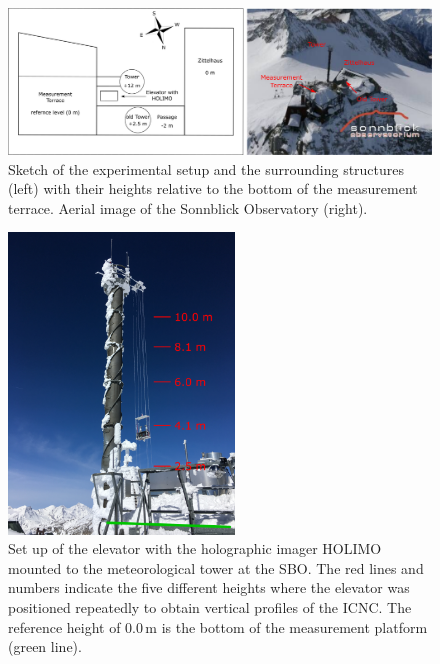 \documentclass[draft,linenumbers]{agujournal}
\begin{document}


\newpage

\begin{figure}[t]
 \centering
 	\includegraphics[width=14cm]{SONSetUp.png}
 \caption{Sketch of the experimental setup and the surrounding structures (left) with their heights relative to the bottom of the measurement terrace. Aerial image of the Sonnblick Observatory (right).}
 \label{fig:SetUp}
\end{figure}

\begin{figure}[t]
 \centering
 	\includegraphics[width=6cm]{tower.png}
 \caption{Set up of the elevator with the holographic imager HOLIMO mounted to the meteorological tower at the SBO. The red lines and numbers indicate the five different heights where the elevator was positioned repeatedly to obtain vertical profiles of the ICNC. The reference height of 0.0\,\si{m} is the bottom of the measurement platform (green line).}
 \label{fig:Elevator}
\end{figure}
\end{document}
